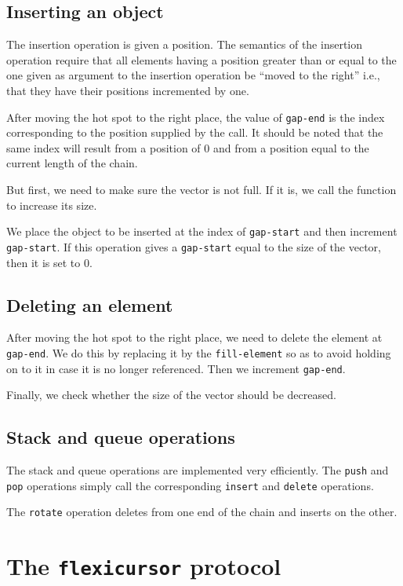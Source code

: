 \documentclass[11pt]{article}
\begin{document}
\subsection{Inserting an object}

The insertion operation is given a position.  The semantics of the
insertion operation require that all elements having a position
greater than or equal to the one given as argument to the insertion
operation be ``moved to the right'' i.e., that they have their
positions incremented by one.

After moving the hot spot to the right place, the value of
\texttt{gap-end} is the index corresponding to the position supplied
by the call.  It should be noted that the same index will result from
a position of $0$ and from a position equal to the current length of
the chain.

But first, we need to make sure the vector is not full.  If it is, we
call the function to increase its size. 

We place the object to be inserted at the index of \texttt{gap-start}
and then increment \texttt{gap-start}.  If this operation gives a
\texttt{gap-start} equal to the size of the vector, then it is set to
$0$.

\subsection{Deleting an element}

After moving the hot spot to the right place, we need to delete the
element at \texttt{gap-end}.  We do this by replacing it by the
\texttt{fill-element} so as to avoid holding on to it in case it is no
longer referenced.  Then we increment \texttt{gap-end}.

Finally, we check whether the size of the vector should be decreased. 

\subsection{Stack and queue operations}

The stack and queue operations are implemented very efficiently.  The
\texttt{push} and \texttt{pop} operations simply call the
corresponding \texttt{insert} and \texttt{delete} operations. 

The \texttt{rotate} operation deletes from one end of the chain and
inserts on the other. 

\section{The \texttt{flexicursor} protocol}
\end{document}
